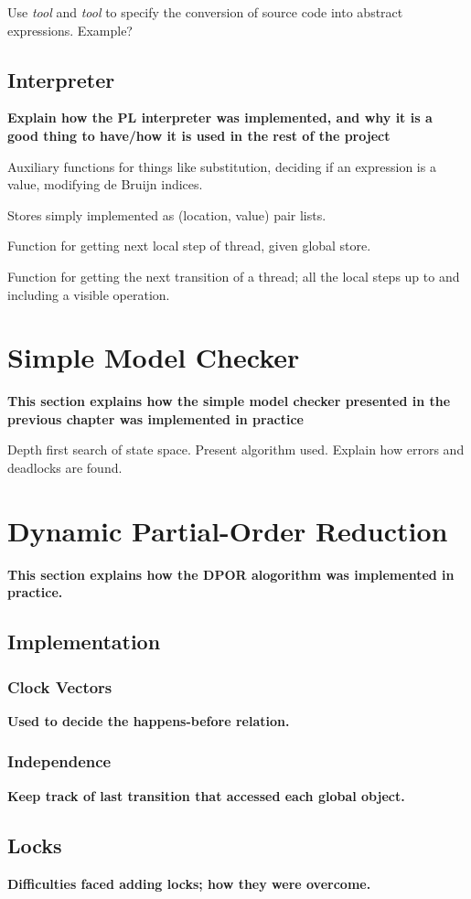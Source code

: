 \documentclass[12pt,a4paper,twoside,openright]{report}
\begin{document}
Use \emph{tool} and \emph{tool} to specify the conversion of source code
into abstract expressions. Example?

\subsection{Interpreter}
\textbf{Explain how the PL interpreter was implemented,
	and why it is a good thing to have/how it is used
	in the rest of the project}

Auxiliary functions for things like substitution, deciding if
an expression is a value, modifying de Bruijn indices.

Stores simply implemented as (location, value) pair lists.

Function for getting next local step of thread, given global store.

Function for getting the next transition of a thread; all the local
steps up to and including a visible operation.

\section{Simple Model Checker}
\textbf{This section explains how the simple model
	checker presented in the previous chapter was
	implemented in practice}

Depth first search of state space. Present algorithm used.
Explain how errors and deadlocks are found.

\section{Dynamic Partial-Order Reduction}
\textbf{This section explains how the DPOR
	alogorithm was implemented in practice.}

\subsection{Implementation}
\subsubsection{Clock Vectors}
\textbf{Used to decide the happens-before relation.}
\subsubsection{Independence}
\textbf{Keep track of last transition that accessed
	each global object.}

\subsection{Locks}
\textbf{Difficulties faced adding locks;
	how they were overcome.}
\end{document}
